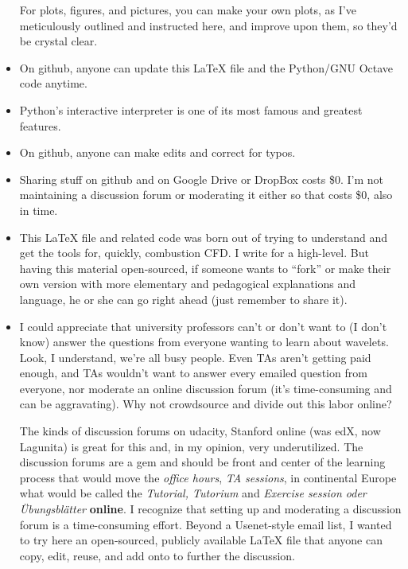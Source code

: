 \documentclass[twoside]{amsart}
\theoremstyle{plain}
\theoremstyle{definition}
\theoremstyle{remark}
\numberwithin{equation}{section}
\begin{document}
\begin{itemize}
For plots, figures, and pictures, you can make your own plots, as I've meticulously outlined and instructed here, and improve upon them, so they'd be crystal clear.  
\item On github, anyone can update this LaTeX file and the Python/GNU Octave code anytime.
\item Python's interactive interpreter is one of its most famous and greatest features.
\item On github, anyone can make edits and correct for typos.
\item Sharing stuff on github and on Google Drive or DropBox costs \$0.  I'm not maintaining a discussion forum or moderating it either so that costs \$0, also in time.  
\item This LaTeX file and related code was born out of trying to understand and get the tools for, quickly, combustion CFD.  I write for a high-level.  But having this material open-sourced, if someone wants to ``fork'' or make their own version with more elementary and pedagogical explanations and language, he or she can go right ahead (just remember to share it).   
\item I could appreciate that university professors can't or don't want to (I don't know) answer the questions from everyone wanting to learn about wavelets.  Look, I understand, we're all busy people.  Even TAs aren't getting paid enough, and TAs wouldn't want to answer every emailed question from everyone, nor moderate an online discussion forum (it's time-consuming and can be aggravating).  Why not crowdsource and divide out this labor online?  

The kinds of discussion forums on udacity, Stanford online (was edX, now Lagunita) is great for this and, in my opinion, very underutilized.  The discussion forums are a gem and should be front and center of the learning process that would move the \emph{office hours}, \emph{TA sessions}, in continental Europe what would be called the \emph{Tutorial, Tutorium} and \emph{Exercise session oder \"{U}bungsbl\"{a}tter} \textbf{online}.  I recognize that setting up and moderating a discussion forum is a time-consuming effort.  Beyond a Usenet-style email list, I wanted to try here an open-sourced, publicly available LaTeX file that anyone can copy, edit, reuse, and add onto to further the discussion.  


\end{itemize}
\end{document}
